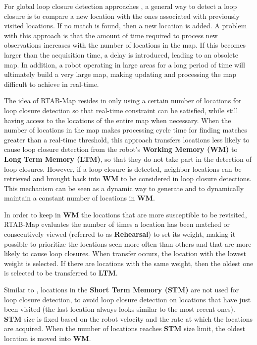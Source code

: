 For global loop closure detection approaches \citep{newman2006outdoor,cummins2008fabmap,angeli2008incremental,botterill2011bow,konolige2010view}, a general way to detect a loop closure is to compare a new location with the ones associated with previously visited locations. If no match is found, then a new location is added. A problem with this approach is that the amount of time required to process new observations increases with the number of locations in the map. If this becomes larger than the acquisition time, a delay is introduced, leading to an obsolete map. In addition, a robot operating in large areas for a long period of time will ultimately build a very large map, making updating and processing the map difficult to achieve in real-time.

The idea of RTAB-Map resides in only using a certain number of locations for loop closure detection so that real-time constraint can be satisfied, while still having access to the locations of the entire map when necessary. When the number of locations in the map makes processing cycle time for finding matches greater than a real-time threshold, this approach transfers locations less likely to cause loop closure detection from the robot’s \textbf{Working Memory (WM)} to \textbf{Long Term Memory (LTM)}, so that they do not take part in the detection of loop closures. However, if a loop closure is detected, neighbor locations can be retrieved and brought back into \textbf{WM} to be considered in loop closure detections. This mechanism can be seen as a dynamic way to generate and to dynamically maintain a constant number of locations in \textbf{WM}.

In order to keep in \textbf{WM} the locations that are more susceptible to be revisited, RTAB-Map evaluates the number of times a location has been matched or consecutively viewed (referred to as \textbf{Rehearsal}) to set its weight, making it possible to prioritize the locations seen more often than others and that are more likely to cause loop closures. When transfer occurs, the location with the lowest weight is selected. If there are locations with the same weight, then the oldest one is selected to be transferred to \textbf{LTM}.

Similar to \citep{angeli2008incremental}, locations in the \textbf{Short Term Memory (STM)} are not used for loop closure detection, to avoid loop closure detection on locations that have just been visited (the last location always looks similar to the most recent ones). \textbf{STM} size is fixed based on the robot velocity and the rate at which the locations are acquired. When the number of locations reaches \textbf{STM} size limit, the oldest location is moved into \textbf{WM}.


